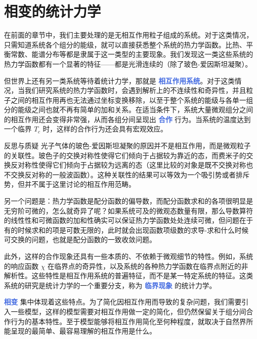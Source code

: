 \chapter{相变的统计力学}\label{cha:相变的统计力学}

在前面的章节中，我们主要处理的是无相互作用粒子组成的系统。对于这类情况，只需知道系统各个组分的能级，就可以直接获悉整个系统的热力学函数。比热、平衡常数、能谱分布等都是隶属于这一类型的主要现象。我们发现这一类这些系统的热力学函数都有一个显著的特征——都是光滑连续的（除了玻色-爱因斯坦凝聚）。

但世界上还有另一类系统等待着统计力学，那就是 \textcolor{RoyalBlue}{\textbf{\kaishu 相互作用系统}}。对于这类情况，当我们研究系统的热力学函数时，会遇到解析上的不连续性和奇异性，并且粒子之间的相互作用再也无法通过坐标变换移除，以至于整个系统的能级与各单一组分的能级之间也就不再有简单的加和关系。在适当条件下，系统大量微观组分之间的相互作用还会变得非常强，从而各组分间呈现出 \textcolor{RoyalBlue}{\textbf{\kaishu 合作}} 行为。当系统的温度达到一个临界 $T_c$ 时，这样的合作行为还会具有宏观效应。

\begin{justification}{\kaishu 反思与质疑}
\kaishu \fontsize{11pt}{16pt}
    \quad\quad 光子气体的玻色-爱因斯坦凝聚的原因并不是相互作用，而是微观粒子的关联性。玻色子的交换对称性使得它们倾向于占据较为靠近的态，而费米子的交换反对称性使得它们倾向于占据较为远离的态（这里比较的对象是既不交换对称也不交换反对称的一般波函数）。这种关联性的结果可以等效为一个吸引势或者排斥势，但并不属于这里讨论的相互作用范畴。

    \quad\quad 另一个问题是：热力学函数是配分函数的偏导数，而配分函数求和的各项很明显是无穷阶可微的，怎么就奇异了呢？如果系统可及的微观态数量有限，那么导数算符的线性性和可微函数的加和性确实可以保证热力学函数处处连续可微，但问题在于有的时候求和的项是可数无限的，此时就会出现函数项级数的求导-求和什么时候可交换的问题，也就是配分函数的一致收敛问题。
\end{justification}

此外，这样的合作现象还具有一些本质的、不依赖于微观细节的特性。例如，系统的响应函数 $\chi $ 在临界点的奇异性，以及系统的各种热力学函数在临界点附近的非解析性。这些特性是相互作用系统的普遍特征，而不是某一特定系统的特征。这类系统的研究是统计力学的一个重要分支，称为 \textcolor{RoyalBlue}{\textbf{\kaishu 临界现象}} 的统计力学。

\textcolor{RoyalBlue}{\textbf{\kaishu 相变}} 集中体现着这些特点。为了简化因相互作用而导致的复杂问题，我们需要引入一些模型，这样的模型需要对相互作用做一定的简化，但仍然保留关于组分间合作行为的基本特性。至于模型能够将相互作用简化至何种程度，就取决于自然界所能呈现的最简单、最容易理解的相互作用是什么。


